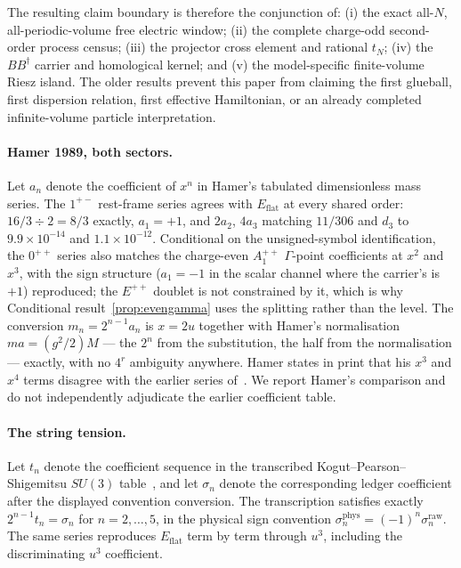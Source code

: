 \documentclass[11pt]{article}
\theoremstyle{plain}
\theoremstyle{definition}
\theoremstyle{remark}
\newcommand{\chk}[1]{}
\newcommand{\dg}{^{\dagger}}
\begin{document}
The resulting claim boundary is therefore the conjunction of: (i) the exact
all-$N$, all-periodic-volume free electric window; (ii) the complete
charge-odd second-order process census; (iii) the projector cross element and
rational $t_N$; (iv) the $BB\dg$ carrier and homological kernel; and (v) the
model-specific finite-volume Riesz island.  The older results prevent this
paper from claiming the first glueball, first dispersion relation, first
effective Hamiltonian, or an already completed infinite-volume particle
interpretation.

\paragraph{Hamer 1989, both sectors.} Let $a_n$ denote the coefficient of
$x^n$ in Hamer's tabulated dimensionless mass series. The $1^{+-}$ rest-frame series agrees
with $E_{\mathrm{flat}}$ at every shared order: $16/3\div2=8/3$ exactly,
$a_1=+1$, and $2a_2$, $4a_3$ matching $11/306$ and $d_3$ to $9.9\times10^{-14}$
and $1.1\times10^{-12}$. Conditional on the unsigned-symbol identification,
the $0^{++}$ series also matches the charge-even $A_1^{++}$ $\Gamma$-point
coefficients at $x^2$ and $x^3$, with the sign structure ($a_1=-1$ in the
scalar channel where the carrier's is $+1$) reproduced; the $E^{++}$ doublet is
not constrained by it, which is why Conditional result~\ref{prop:evengamma}
uses the splitting rather than the level. The conversion
$m_n=2^{n-1}a_n$ is $x=2u$ together
with Hamer's normalisation $ma=(g^2/2)M$ --- the $2^n$ from the substitution,
the half from the normalisation --- exactly, with no $4^r$ ambiguity anywhere.
Hamer states in print that his $x^3$ and $x^4$ terms disagree with the earlier
series of~\cite{KSS1976}. We report Hamer's comparison and do not independently
adjudicate the earlier coefficient table.
\chk{Hamer's 1+- series matches the C-odd Gamma-point coefficients through x\^{}3}
\chk{Hamer's 0++ series matches the C-even Gamma-point coefficients through x\^{}3}
\chk{the m\_n = 2\^{}(n-1) a\_n bridge is the x = 2u conversion}
\chk{the Hamer table metadata is pinned; no fourth-order agreement is used}

\paragraph{The string tension.} Let $t_n$ denote the coefficient sequence in
the transcribed Kogut--Pearson--Shigemitsu $SU(3)$ table~\cite{KPS1981}, and
let $\sigma_n$ denote the corresponding ledger coefficient after the displayed
convention conversion. The transcription satisfies exactly
$2^{n-1}t_n=\sigma_n$ for $n=2,\dots,5$, in the physical sign convention
$\sigma_n^{\mathrm{phys}}=(-1)^n\sigma_n^{\mathrm{raw}}$. The same series
reproduces $E_{\mathrm{flat}}$ term by term through $u^3$, including the
discriminating $u^3$ coefficient.
\chk{the KPS 1980 string-tension table equals the certified sigma series EXACTLY}
\chk{sigma\_n\^{}phys = (-1)\^{}n sigma\_n\^{}raw, and C5 is the n = 3 case}
\chk{the ratio and sigma series reproduce E\_flat exactly}
\end{document}
